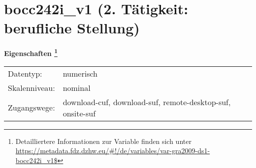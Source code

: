 
    \setcounter{footnote}{0}

    \vspace*{-1.8cm}
	\section{bocc242i\_v1 (2. Tätigkeit: berufliche Stellung)}
	\label{section:bocc242i_v1}



    \vspace*{0.5cm}
    \noindent\textbf{Eigenschaften
	\footnote{Detailliertere Informationen zur Variable finden sich unter
		\url{https://metadata.fdz.dzhw.eu/\#!/de/variables/var-gra2009-ds1-bocc242i_v1$}}}\\
	\begin{tabularx}{\hsize}{@{}lX}
	Datentyp: & numerisch \\
	Skalenniveau: & nominal \\
	Zugangswege: &
	  download-cuf, 
	  download-suf, 
	  remote-desktop-suf, 
	  onsite-suf
 \\
    \end{tabularx}



